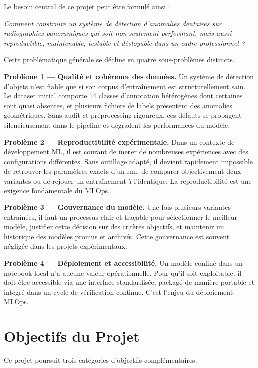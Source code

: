 \documentclass{rapportENSIAS}
\begin{document}
Le besoin central de ce projet peut être formulé ainsi :

\begin{center}
\textit{Comment construire un système de détection d'anomalies dentaires sur radiographies panoramiques qui soit non seulement performant, mais aussi reproductible, maintenable, testable et déployable dans un cadre professionnel ?}
\end{center}

Cette problématique générale se décline en quatre sous-problèmes distincts.

\textbf{Problème 1 — Qualité et cohérence des données.} Un système de détection d'objets n'est fiable que si son corpus d'entraînement est structurellement sain. Le dataset initial comporte 14 classes d'annotation hétérogènes dont certaines sont quasi absentes, et plusieurs fichiers de labels présentent des anomalies géométriques. Sans audit et préprocessing rigoureux, ces défauts se propagent silencieusement dans le pipeline et dégradent les performances du modèle.

\textbf{Problème 2 — Reproductibilité expérimentale.} Dans un contexte de développement ML, il est courant de mener de nombreuses expériences avec des configurations différentes. Sans outillage adapté, il devient rapidement impossible de retrouver les paramètres exacts d'un run, de comparer objectivement deux variantes ou de rejouer un entraînement à l'identique. La reproductibilité est une exigence fondamentale du MLOps.

\textbf{Problème 3 — Gouvernance du modèle.} Une fois plusieurs variantes entraînées, il faut un processus clair et traçable pour sélectionner le meilleur modèle, justifier cette décision sur des critères objectifs, et maintenir un historique des modèles promus et archivés. Cette gouvernance est souvent négligée dans les projets expérimentaux.

\textbf{Problème 4 — Déploiement et accessibilité.} Un modèle confiné dans un notebook local n'a aucune valeur opérationnelle. Pour qu'il soit exploitable, il doit être accessible via une interface standardisée, packagé de manière portable et intégré dans un cycle de vérification continue. C'est l'enjeu du déploiement MLOps.

\section{Objectifs du Projet}

Ce projet poursuit trois catégories d'objectifs complémentaires.
\end{document}
